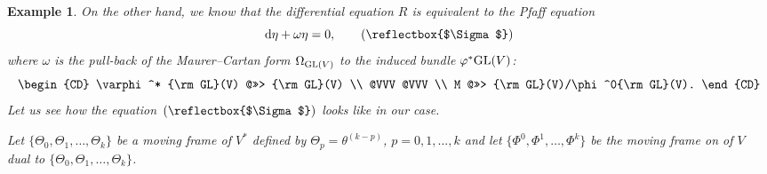 \documentclass[10pt,a4paper]{amsart}
\newcommand{\cR}{R}
\DeclareRobustCommand{\amgiS}{\text{\reflectbox{$\Sigma$}}}
\newtheorem{ex}[thm]{Example}
\numberwithin{equation}{section}
\begin{document}
\begin{ex}
On the other hand, we know that the differential equation $\cR$ is equivalent to the Pfaff equation
\[
{\rm d}\eta +\omega\eta = 0,\tag{\amgiS}
\]
where $\omega$ is the pull-back of the Maurer--Cartan form $\Omega_{{\rm GL}(V)}$ to the induced bundle $\varphi^*{\rm GL}(V)$:
\[
\begin{CD}
	\varphi^* {\rm GL}(V) @>>> {\rm GL}(V) \\
	@VVV @VVV \\
	M @>>> {\rm GL}(V)/\phi^0{\rm GL}(V).
\end{CD}
\]
Let us see how the equation~$(\amgiS)$ looks like in our case.

Let $\{\Theta_0,\Theta_1,\dots,\Theta_k\}$ be a moving frame of $V^*$ defined by $\Theta_p=\theta^{(k-p)}$, $p=0,1,\dots,k$ and let $\big\{\Phi^0,\Phi^1,\dots,\Phi^k\big\}$ be the moving frame on of $V$ dual to $\{\Theta_0,\Theta_1,\dots,\Theta_k\}$.


\end{ex}
\end{document}
